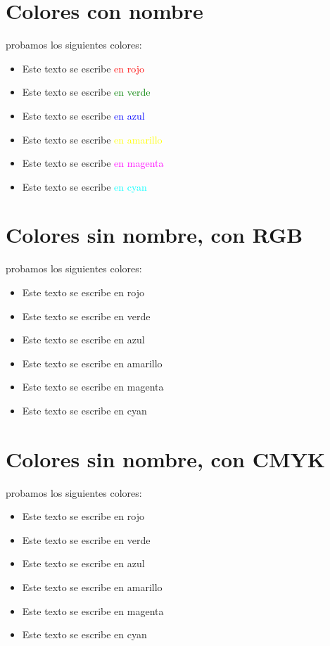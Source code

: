 \documentclass[10pt,a4paper]{article}
\begin{document}
	\section{Colores con nombre}
	probamos los siguientes colores:
	\begin{itemize}
	\item Este texto se escribe \textcolor{red} {en rojo}
	\item Este texto se escribe \textcolor{green} {en verde}
	\item Este texto se escribe \textcolor{blue} {en azul}
	\item Este texto se escribe \textcolor{yellow} {en amarillo}
	\item Este texto se escribe \textcolor{magenta} {en magenta}
	\item Este texto se escribe \textcolor{cyan} {en cyan}

	\end{itemize}
	
	
	\section{Colores sin nombre, con RGB}
	probamos los siguientes colores:
	\begin{itemize}
	\item Este texto se escribe \textcolor[rgb] {1,0,0} {en rojo}
	\item Este texto se escribe \textcolor[rgb] {0,1,0} {en verde}
	\item Este texto se escribe \textcolor[rgb] {0,0,1} {en azul}
	\item Este texto se escribe \textcolor[rgb] {1,1,0} {en amarillo}
	\item Este texto se escribe \textcolor[rgb] {1,0,0.6} {en magenta}
	\item Este texto se escribe \textcolor[rgb] {0,0.7,1} {en cyan} 

	\end{itemize}
	
	
	
	\section{Colores sin nombre, con CMYK}
	probamos los siguientes colores:
	\begin{itemize}
	\item Este texto se escribe \textcolor[cmyk] {0,1,1,0} {en rojo} 
	\item Este texto se escribe \textcolor[cmyk] {0.7,0,1,0} {en verde}
	\item Este texto se escribe \textcolor[cmyk] {1,1,0,0} {en azul}
	\item Este texto se escribe \textcolor[cmyk] {0,0,1,0} {en amarillo}
	\item Este texto se escribe \textcolor[cmyk] {0,1,0,0} {en magenta}
	\item Este texto se escribe \textcolor[cmyk] {1,0,0,0} {en cyan}
	

	\end{itemize}
	
\end{document}
